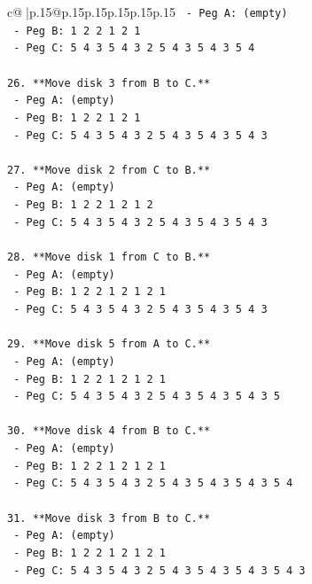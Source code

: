 \documentclass{article}
\begin{document}
{\begin{supertabular}{c@{$\;$}|p{.15\linewidth}@{}p{.15\linewidth}p{.15\linewidth}p{.15\linewidth}p{.15\linewidth}p{.15\linewidth}}
{{{\texttt{    {-} Peg A: (empty)} \\
\texttt{    {-} Peg B: 1 2 2 1 2 1} \\
\texttt{    {-} Peg C: 5 4 3 5 4 3 2 5 4 3 5 4 3 5 4} \\
\\ 
\texttt{26. **Move disk 3 from B to C.**} \\
\texttt{    {-} Peg A: (empty)} \\
\texttt{    {-} Peg B: 1 2 2 1 2 1} \\
\texttt{    {-} Peg C: 5 4 3 5 4 3 2 5 4 3 5 4 3 5 4 3} \\
\\ 
\texttt{27. **Move disk 2 from C to B.**} \\
\texttt{    {-} Peg A: (empty)} \\
\texttt{    {-} Peg B: 1 2 2 1 2 1 2} \\
\texttt{    {-} Peg C: 5 4 3 5 4 3 2 5 4 3 5 4 3 5 4 3} \\
\\ 
\texttt{28. **Move disk 1 from C to B.**} \\
\texttt{    {-} Peg A: (empty)} \\
\texttt{    {-} Peg B: 1 2 2 1 2 1 2 1} \\
\texttt{    {-} Peg C: 5 4 3 5 4 3 2 5 4 3 5 4 3 5 4 3} \\
\\ 
\texttt{29. **Move disk 5 from A to C.**} \\
\texttt{    {-} Peg A: (empty)} \\
\texttt{    {-} Peg B: 1 2 2 1 2 1 2 1} \\
\texttt{    {-} Peg C: 5 4 3 5 4 3 2 5 4 3 5 4 3 5 4 3 5} \\
\\ 
\texttt{30. **Move disk 4 from B to C.**} \\
\texttt{    {-} Peg A: (empty)} \\
\texttt{    {-} Peg B: 1 2 2 1 2 1 2 1} \\
\texttt{    {-} Peg C: 5 4 3 5 4 3 2 5 4 3 5 4 3 5 4 3 5 4} \\
\\ 
\texttt{31. **Move disk 3 from B to C.**} \\
\texttt{    {-} Peg A: (empty)} \\
\texttt{    {-} Peg B: 1 2 2 1 2 1 2 1} \\
\texttt{    {-} Peg C: 5 4 3 5 4 3 2 5 4 3 5 4 3 5 4 3 5 4 3} \\
\\ 
}}}
\end{supertabular}}
\end{document}
